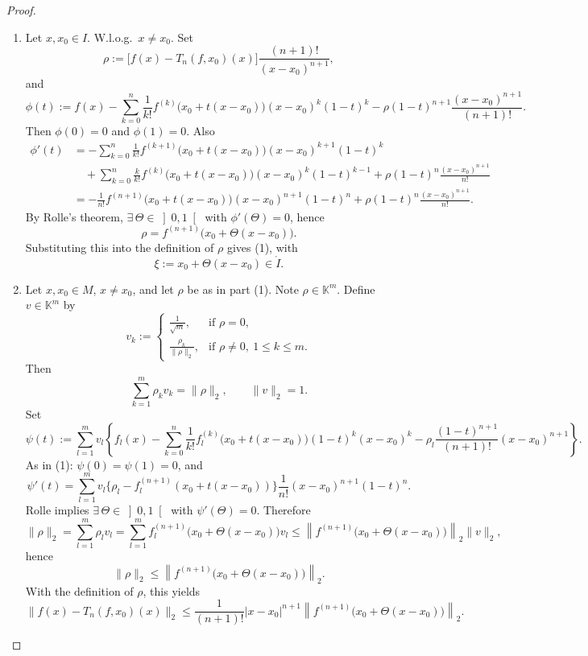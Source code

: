 \documentclass[12pt]{article}
\begin{document}
\begin{proof}
\begin{enumerate}
\item Let $x,x_0\in I$. W.l.o.g.\ $x\neq x_0$. Set
\[
\rho:=\big[f(x)-T_n(f,x_0)(x)\big]\frac{(n+1)!}{(x-x_0)^{n+1}},
\]
and
\[
\phi(t):=
f(x)-\sum_{k=0}^{n}\frac{1}{k!}f^{(k)}\!\big(x_0+t(x-x_0)\big)(x-x_0)^k(1-t)^k
-\rho(1-t)^{n+1}\frac{(x-x_0)^{n+1}}{(n+1)!}.
\]
Then $\phi(0)=0$ and $\phi(1)=0$. Also
\begin{align*}
\phi'(t)
&=
-\sum_{k=0}^{n}\frac{1}{k!}f^{(k+1)}\!\big(x_0+t(x-x_0)\big)(x-x_0)^{k+1}(1-t)^k \\
&\quad
+\sum_{k=0}^{n}\frac{k}{k!}f^{(k)}\!\big(x_0+t(x-x_0)\big)(x-x_0)^k(1-t)^{k-1}
+\rho(1-t)^n\frac{(x-x_0)^{n+1}}{n!} \\
&=
-\frac{1}{n!}f^{(n+1)}\!\big(x_0+t(x-x_0)\big)(x-x_0)^{n+1}(1-t)^n
+\rho(1-t)^n\frac{(x-x_0)^{n+1}}{n!}.
\end{align*}
By Rolle's theorem, $\exists\,\Theta\in\left]0,1\right[$ with $\phi'(\Theta)=0$, hence
\[
\rho=f^{(n+1)}\!\big(x_0+\Theta(x-x_0)\big).
\]
Substituting this into the definition of $\rho$ gives (1), with
\[
\xi:=x_0+\Theta(x-x_0)\in\mathring I.
\]

\item Let $x,x_0\in M$, $x\neq x_0$, and let $\rho$ be as in part (1). Note $\rho\in\mathbb K^m$. Define $v\in\mathbb K^m$ by
\[
v_k:=
\begin{cases}
\frac{1}{\sqrt m}, & \text{if }\rho=0,\\[2mm]
\frac{\rho_k}{\|\rho\|_2}, & \text{if }\rho\neq 0,\ 1\le k\le m.
\end{cases}
\]
Then
\[
\sum_{k=1}^m \rho_k v_k=\|\rho\|_2,\qquad \|v\|_2=1.
\]
Set
\[
\psi(t):=\sum_{l=1}^{m}v_l\left\{
f_l(x)-\sum_{k=0}^{n}\frac{1}{k!}f_l^{(k)}\!\big(x_0+t(x-x_0)\big)(1-t)^k(x-x_0)^k
-\rho_l\frac{(1-t)^{n+1}}{(n+1)!}(x-x_0)^{n+1}
\right\}.
\]
As in (1): $\psi(0)=\psi(1)=0$, and
\[
\psi'(t)=\sum_{l=1}^{m}v_l\{\rho_l-f_l^{(n+1)}(x_0+t(x-x_0))\}\frac{1}{n!}(x-x_0)^{n+1}(1-t)^n.
\]
Rolle implies $\exists\,\Theta\in\left]0,1\right[$ with $\psi'(\Theta)=0$. Therefore
\[
\|\rho\|_2=\sum_{l=1}^{m}\rho_l v_l
=\sum_{l=1}^{m}f_l^{(n+1)}\!\big(x_0+\Theta(x-x_0)\big)v_l
\le
\left\|f^{(n+1)}\!\big(x_0+\Theta(x-x_0)\big)\right\|_2\|v\|_2,
\]
hence
\[
\|\rho\|_2\le \left\|f^{(n+1)}\!\big(x_0+\Theta(x-x_0)\big)\right\|_2.
\]
With the definition of $\rho$, this yields
\[
\|f(x)-T_n(f,x_0)(x)\|_2
\le
\frac{1}{(n+1)!}|x-x_0|^{n+1}
\left\|f^{(n+1)}\!\big(x_0+\Theta(x-x_0)\big)\right\|_2.
\]
\end{enumerate}
\end{proof}
\end{document}
